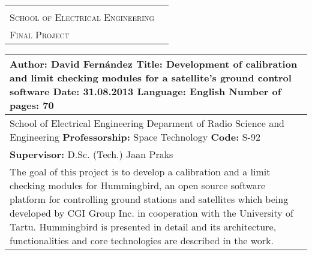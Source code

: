 \thispagestyle{empty}
\begin{tabular}{l r}
\begin{minipage}[c]{102mm} 
\textsc{Aalto University}\\ \textsc{School of Electrical Engineering}
\end{minipage}
 & \hfill
\begin{minipage}[c]{40mm} 
\begin{flushright}
\textsc{Abstract of the}\\ \textsc{Final Project}
\end{flushright}
\end{minipage}\\ 
\end{tabular}

\begin{tabular}{|l|}
\hline %
\begin{minipage}[c][26mm]{\textwidth} 
\vfill
\textbf{Author:} David Fernández \vfill
\textbf{Title:} Development of calibration and limit checking modules for a satellite's ground control software \vfill
\textbf{Date:} 31.08.2013 \hfill \textbf{Language:} English \hfill \textbf{Number of pages:} 70 \vfill
\vfill
\end{minipage}\\ 
\hline

\begin{minipage}[c][18mm]{\textwidth} 
\vfill
School of Electrical Engineering \vfill
Deparment of Radio Science and Engineering \vfill
\textbf{Professorship:} Space Technology \hfill \textbf{Code:} S-92\vfill
\vfill
\end{minipage}\\
\hline

\begin{minipage}[c][12mm]{\textwidth} 
\vfill
\textbf{Supervisor:} D.Sc. (Tech.) Jaan Praks \vfill
\vfill
\end{minipage}\\
\hline
\begin{minipage}[t][133mm]{\textwidth} %
The goal of this project is to develop a calibration and a limit checking modules for Hummingbird, an open source software platform for controlling ground stations and satellites which being developed by CGI Group Inc. in cooperation with the University of Tartu. Hummingbird is presented in detail and its architecture, functionalities and core technologies are described in the work.

 



\end{minipage}
\end{tabular}
